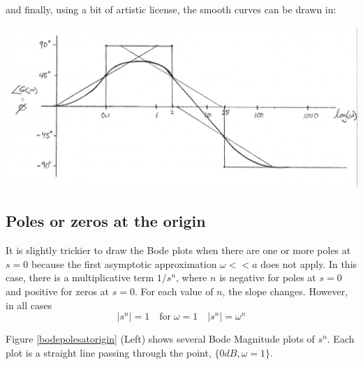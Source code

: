 \begin{Example}
and finally, using a bit of artistic license, the smooth curves can be drawn in:

\includegraphics[width=5.5in]{figs05/00760a.png}


\end{Example}


\subsection{Poles or zeros at the origin}

It is slightly trickier to draw the Bode plots when there are one or more poles at $s=0$ because the first asymptotic approximation $\omega << a$ does not
apply.  In this case, there is a multiplicative term $1/s^n$, where $n$ is negative for poles at $s=0$ and positive for zeros at $s=0$.
For each value of $n$, the slope changes.  However, in all cases
\[
|s^n| = 1 \quad \mathrm{for} \;\omega=1 \quad |s^n| = \omega^n
\]

Figure \ref{bodepolesatorigin} (Left) shows several Bode Magnitude plots of $s^n$.  Each plot is a straight line passing through the point, $\{0dB, \omega=1\}$.

